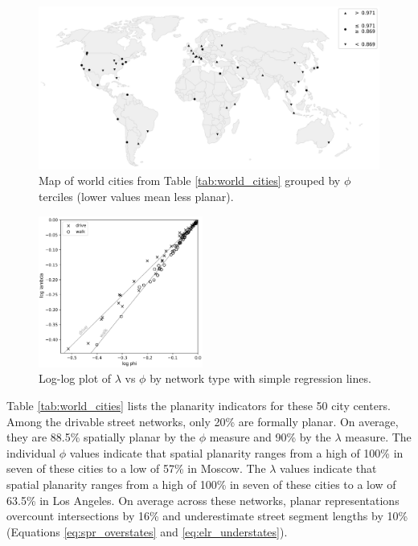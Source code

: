 \documentclass[Afour,sageh,times]{sagej}
\begin{document}
\begin{figure}[htbp]
	\center
	\includegraphics[width=\textwidth]{world_map_bw.png}
	\caption{Map of world cities from Table \ref{tab:world_cities} grouped by $\phi$ terciles (lower values mean less planar).}
	\label{fig:world_map_bw}
\end{figure}

\begin{figure}[htbp]
	\includegraphics[width=0.48\textwidth]{regression_phi_split.png}
	\caption{Log-log plot of $\lambda$ vs $\phi$ by network type with simple regression lines.}
	\label{fig:regression_split}
\end{figure}

Table \ref{tab:world_cities} lists the planarity indicators for these 50 city centers. Among the drivable street networks, only 20\% are formally planar. On average, they are 88.5\% spatially planar by the $\phi$ measure and 90\% by the $\lambda$ measure. The individual $\phi$ values indicate that spatial planarity ranges from a high of 100\% in seven of these cities to a low of 57\% in Moscow. The $\lambda$ values indicate that spatial planarity ranges from a high of 100\% in seven of these cities to a low of 63.5\% in Los Angeles. On average across these networks, planar representations overcount intersections by 16\% and underestimate street segment lengths by 10\% (Equations \ref{eq:spr_overstates} and \ref{eq:elr_understates}).
\end{document}
